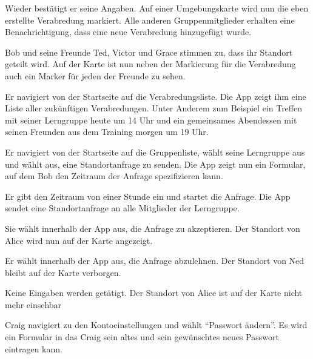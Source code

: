 \documentclass[parskip=full,11pt]{scrartcl}
\begin{document}
{Wieder bestätigt er seine Angaben.}
{Auf einer Umgebungskarte wird nun die eben erstellte Verabredung markiert.
Alle anderen Gruppenmitglieder erhalten eine Benachrichtigung,
dass eine neue Verabredung hinzugefügt wurde.}

{Bob und seine Freunde Ted, Victor und Grace stimmen zu, dass ihr Standort geteilt wird.}
{Auf der Karte ist nun neben der Markierung für die Verabredung auch ein Marker für
jeden der Freunde zu sehen.}


{Er navigiert von der Startseite auf die Verabredungsliste.}
{Die App zeigt ihm eine Liste aller zukünftigen Verabredungen.
Unter Anderem zum Beispiel ein Treffen mit seiner Lerngruppe heute um 14 Uhr
und ein gemeinsames Abendessen mit seinen Freunden aus dem Training morgen um 19 Uhr.}


{Er navigiert von der Startseite auf die Gruppenliste, wählt seine Lerngruppe aus und wählt aus, eine Standortanfrage zu senden.}
{Die App zeigt nun ein Formular, auf dem Bob den Zeitraum der Anfrage spezifizieren kann.}

{Er gibt den Zeitraum von einer Stunde ein und startet die Anfrage.}
{Die App sendet eine Standortanfrage an alle Mitglieder der Lerngruppe.}

{Sie wählt innerhalb der App aus, die Anfrage zu akzeptieren.}
{Der Standort von Alice wird nun auf der Karte angezeigt.}

{Er wählt innerhalb der App aus, die Anfrage abzulehnen.}
{Der Standort von Ned bleibt auf der Karte verborgen.}

{Keine Eingaben werden getätigt.}
{Der Standort von Alice ist auf der Karte nicht mehr einsehbar}


{Craig navigiert zu den Kontoeinstellungen und wählt \enquote{Passwort ändern}.}
{Es wird ein Formular in das Craig sein altes und sein gewünschtes neues Passwort eintragen kann.}
\end{document}
